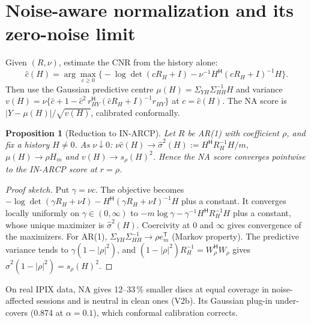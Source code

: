 \documentclass[11pt]{article}
\newtheorem{proposition}{Proposition}
\theoremstyle{remark}\newtheorem{remark}{Remark}
\begin{document}
\section{Noise-aware normalization and its zero-noise limit}
Given $(R,\nu)$, estimate the CNR from the history alone:
\[
\widehat c(H)=\arg\max_{c\ge0}\Big\{-\log\det(cR_H+I)-\nu^{-1}H^{\mathsf H}(cR_H+I)^{-1}H\Big\}.
\]
Then use the Gaussian predictive centre $\mu(H)=\Sigma_{YH}\Sigma_{HH}^{-1}H$ and variance $v(H)=\nu\{\widehat c+1-\widehat c^2\,r_{HY}^{\mathsf H}(\widehat cR_H+I)^{-1}r_{HY}\}$ at $c=\widehat c(H)$. The NA score is $|Y-\mu(H)|/\sqrt{v(H)}$, calibrated conformally.

\begin{proposition}[Reduction to IN-ARCP]\label{prop:reduce}
Let $R$ be AR(1) with coefficient $\rho$, and fix a history $H\ne0$. As $\nu\downarrow0$: $\nu\widehat c(H)\to \widehat\sigma^2(H):=H^{\mathsf H}R_H^{-1}H/m$, $\mu(H)\to\rho H_m$ and $v(H)\to s_\rho(H)^2$. Hence the NA score converges pointwise to the IN-ARCP score at $r=\rho$.
\end{proposition}
\begin{proof}[Proof sketch]
Put $\gamma=\nu c$. The objective becomes $-\log\det(\gamma R_H+\nu I)-H^{\mathsf H}(\gamma R_H+\nu I)^{-1}H$ plus a constant. It converges locally uniformly on $\gamma\in(0,\infty)$ to $-m\log\gamma-\gamma^{-1}H^{\mathsf H}R_H^{-1}H$ plus a constant, whose unique maximizer is $\widehat\sigma^2(H)$. Coercivity at $0$ and $\infty$ gives convergence of the maximizers. For AR(1), $\Sigma_{YH}\Sigma_{HH}^{-1}\to\rho e_m^{\mathsf T}$ (Markov property). The predictive variance tends to $\gamma(1-|\rho|^2)$, and $(1-|\rho|^2)R_H^{-1}=W_\rho^{\mathsf H}W_\rho$ gives $\widehat\sigma^2(1-|\rho|^2)=s_\rho(H)^2$.
\end{proof}
\noindent On real IPIX data, NA gives 12--33\,\% smaller discs at equal coverage in noise-affected sessions and is neutral in clean ones (V2b). Its Gaussian plug-in under-covers (0.874 at $\alpha=0.1$), which conformal calibration corrects.
\end{document}
